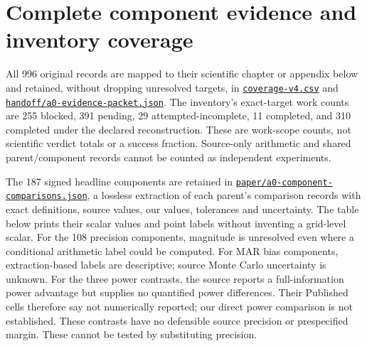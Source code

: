 \documentclass[11pt]{article}
\newcommand{\file}[1]{\href{https://github.com/alectionary/vibe-math/blob/master/formalization/schwabe-psychometric-genetics/#1}{\nolinkurl{#1}}}
\begin{document}
\section{Complete component evidence and inventory coverage}\label{sec:inventory}
All 996 original records are mapped to their scientific chapter or appendix below and retained, without dropping unresolved targets, in \file{coverage-v4.csv} and \file{handoff/a0-evidence-packet.json}. The inventory's exact-target work counts are 255 blocked, 391 pending, 29 attempted-incomplete, 11 completed, and 310 completed under the declared reconstruction. These are work-scope counts, not scientific verdict totals or a success fraction. Source-only arithmetic and shared parent/component records cannot be counted as independent experiments.

The 187 signed headline components are retained in \file{paper/a0-component-comparisons.json}, a lossless extraction of each parent's comparison records with exact definitions, source values, our values, tolerances and uncertainty. The table below prints their scalar values and point labels without inventing a grid-level scalar. For the 108 precision components, magnitude is unresolved even where a conditional arithmetic label could be computed. For MAR bias components, extraction-based labels are descriptive; source Monte Carlo uncertainty is unknown. For the three power contrasts, the source reports a full-information power advantage but supplies no quantified power differences. Their Published cells therefore say not numerically reported; our direct power comparison is not established. These contrasts have no defensible source precision or prespecified margin. These cannot be tested by substituting precision.
\end{document}
